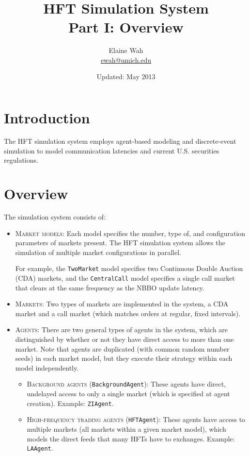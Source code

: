 \documentclass[11pt]{article}
\begin{document}
	
\title{HFT Simulation System \\
Part I: Overview}
\author{
Elaine Wah\\
\href{mailto:ewah@umich.edu}{ewah@umich.edu}
}
\date{Updated: May 2013}
\maketitle


\section{Introduction}

The HFT simulation system employs agent-based modeling and discrete-event simulation to model communication latencies and current U.S. securities regulations.


\section{Overview}

The simulation system consists of:
\begin{itemize}
\item \textsc{Market models}: Each model specifies the number, type of, and configuration parameters of markets present. The HFT simulation system allows the simulation of multiple market configurations in parallel.

For example, the \verb|TwoMarket| model specifies two Continuous Double Auction (CDA) markets, and the \verb|CentralCall| model specifies a single call market that clears at the same frequency as the NBBO update latency. 

\item \textsc{Markets}: Two types of markets are implemented in the system, a CDA market and a call market (which matches orders at regular, fixed intervals).

\item \textsc{Agents}: There are two general types of agents in the system, which are distinguished by whether or not they have direct access to more than one market. Note that agents are duplicated (with common random number seeds) in each market model, but they execute their strategy within each model independently.

\begin{itemize}
\item \textsc{Background agents} (\verb|BackgroundAgent|): These agents have direct, undelayed access to only a single market (which is specified at agent creation). Example: \verb|ZIAgent|.

\item \textsc{High-frequency trading agents} (\verb|HFTAgent|): These agents have access to multiple markets (all markets within a given market model), which models the direct feeds that many HFTs have to exchanges. Example: \verb|LAAgent|.
\end{itemize}
\end{itemize}
\end{document}
